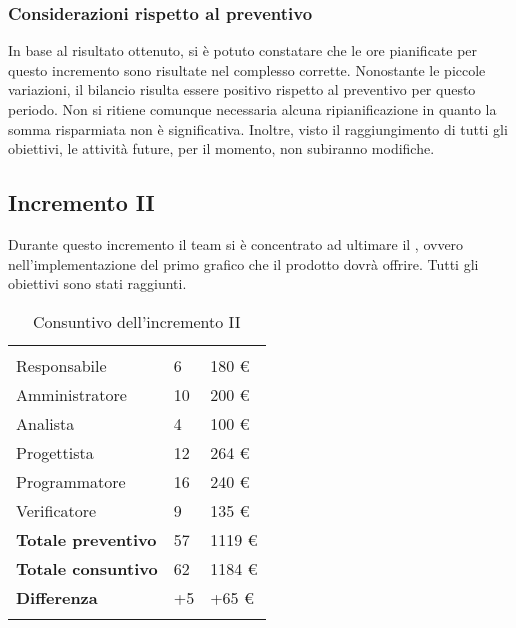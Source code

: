 \subsubsection{Considerazioni rispetto al preventivo}

In base al risultato ottenuto, si è potuto constatare che le ore pianificate per questo incremento sono risultate nel complesso corrette. Nonostante le piccole variazioni, il bilancio risulta essere positivo rispetto al preventivo per questo periodo. Non si ritiene comunque necessaria alcuna ripianificazione in quanto la somma risparmiata non è significativa. Inoltre, visto il raggiungimento di tutti gli obiettivi, le attività future, per il momento, non subiranno modifiche.

\newpage

\subsection{Incremento II}
Durante questo incremento il team si è concentrato ad ultimare il , ovvero nell'implementazione del primo grafico che il prodotto dovrà offrire. Tutti gli obiettivi sono stati raggiunti.%

{
\setlength\arrayrulewidth{1pt}
\begin{longtable}{ C{4cm} C{3cm} C{3.5cm}} 
 	 &
 	 &
 	 \\
 	
 	Responsabile & 6 & 180 € \\
 	Amministratore & 10 & 200 €\\
 	Analista & 4  & 100 € \\
 	Progettista & 12 & 264 € \\
 	Programmatore & 16  & 240 € \\
 	Verificatore & 9  & 135 €\\
 	
	\hline 	
 	
 	\textbf{Totale preventivo} &
	57 &
 	1119 € \\		
 	
 	\textbf{Totale consuntivo} &
	62 &
 	1184 € \\	
 	
 	\textbf{Differenza} &
	+5 &
 	+65 € \\	
 	
 	\caption{Consuntivo dell'incremento II}
\end{longtable}
}

